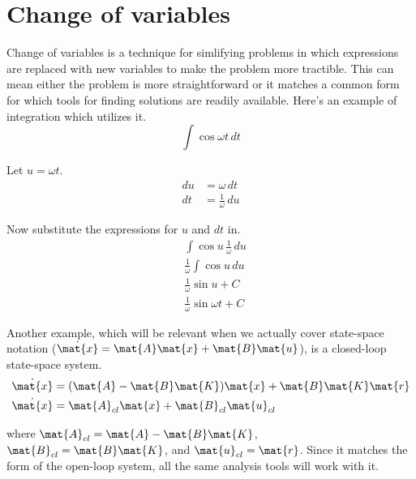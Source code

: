 \section{Change of variables}
\label{sec:calculus_change_of_variables}

Change of variables is a technique for simlifying problems in which expressions
are replaced with new variables to make the problem more tractible. This can
mean either the problem is more straightforward or it matches a common form for
which tools for finding solutions are readily available. Here's an example of
integration which utilizes it.
\begin{equation*}
  \int \cos\omega t \,dt
\end{equation*}

Let $u = \omega t$.
\begin{align*}
  du &= \omega \,dt \\
  dt &= \frac{1}{\omega} \,du
\end{align*}

Now substitute the expressions for $u$ and $dt$ in.
\begin{align*}
  &\int \cos u \,\frac{1}{\omega} \,du \\
  &\frac{1}{\omega} \int \cos u \,du \\
  &\frac{1}{\omega} \sin u + C \\
  &\frac{1}{\omega} \sin\omega t + C
\end{align*}

Another example, which will be relevant when we actually cover state-space
notation ($\dot{\mat{x}} = \mat{A}\mat{x} + \mat{B}\mat{u}$), is a closed-loop
state-space system.
\begin{align*}
  \dot{\mat{x}} &= (\mat{A} - \mat{B}\mat{K})\mat{x} + \mat{B}\mat{K}\mat{r} \\
  \dot{\mat{x}} &= \mat{A}_{cl}\mat{x} + \mat{B}_{cl}\mat{u}_{cl}
\end{align*}

where $\mat{A}_{cl} = \mat{A} - \mat{B}\mat{K}$, $\mat{B}_{cl} = \mat{B}\mat{K}$,
and $\mat{u}_{cl} = \mat{r}$. Since it matches the form of the open-loop system,
all the same analysis tools will work with it.
